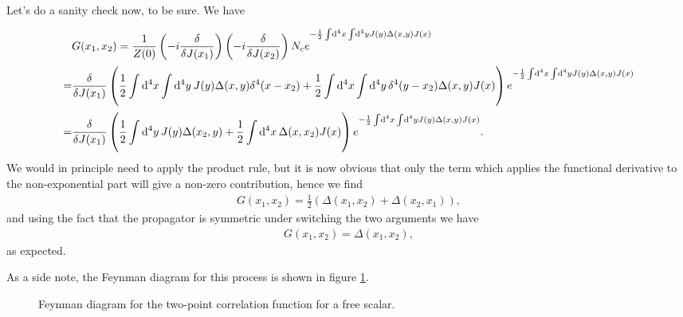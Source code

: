 Let's do a sanity check now, to be sure. We have
\begin{align*}
	&G(x_{1}, x_{2}) = \frac{1}{Z(0)}\left(-i\fdv{J(x_{1})}\right)\left(-i\fdv{J(x_{2})}\right)N_{c}e^{-\frac{1}{2}\integ[4]{}{}{x}{\integ[4]{}{}{y}{J(y)\Delta(x, y)J(x)}}} \\
	                =& \fdv{J(x_{1})}\left(\frac{1}{2}\integ[4]{}{}{x}{\integ[4]{}{}{y}{J(y)\Delta(x, y)\delta^{4}(x - x_{2})}} + \frac{1}{2}\integ[4]{}{}{x}{\integ[4]{}{}{y}{\delta^{4}(y - x_{2})\Delta(x, y)J(x)}}\right)e^{-\frac{1}{2}\integ[4]{}{}{x}{\integ[4]{}{}{y}{J(y)\Delta(x, y)J(x)}}} \\
	                =& \fdv{J(x_{1})}\left(\frac{1}{2}\integ[4]{}{}{y}{J(y)\Delta(x_{2}, y)} + \frac{1}{2}\integ[4]{}{}{x}{\Delta(x, x_{2})J(x)}\right)e^{-\frac{1}{2}\integ[4]{}{}{x}{\integ[4]{}{}{y}{J(y)\Delta(x, y)J(x)}}}.
\end{align*}
We would in principle need to apply the product rule, but it is now obvious that only the term which applies the functional derivative to the non-exponential part will give a non-zero contribution, hence we find
\begin{align*}
	G(x_{1}, x_{2}) = \frac{1}{2}(\Delta(x_{1}, x_{2}) + \Delta(x_{2}, x_{1})),
\end{align*}
and using the fact that the propagator is symmetric under switching the two arguments we have
\begin{align*}
	G(x_{1}, x_{2}) = \Delta(x_{1}, x_{2}),
\end{align*}
as expected.

As a side note, the Feynman diagram for this process is shown in figure \ref{fig:free_scalar_fd}.
\begin{figure}[!ht]
	\centering
	\caption{Feynman diagram for the two-point correlation function for a free scalar.}
	\label{fig:free_scalar_fd}
\end{figure}

